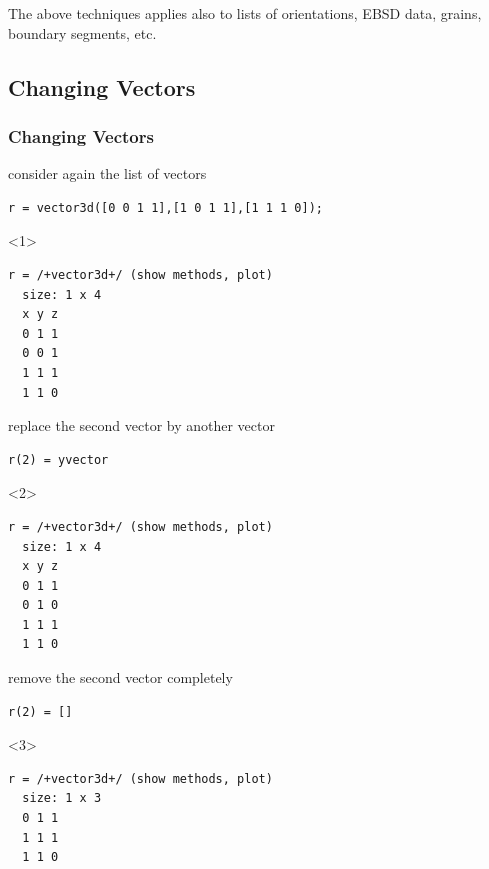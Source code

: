 \documentclass[compress]{beamer}
\begin{document}
\begin{frame}[fragile]
\begin{overlayarea}{\textwidth}{8cm}
    \pause \medskip

    \alert{The above techniques applies also to lists of
    orientations, EBSD data, grains, boundary segments, etc.}
  \end{overlayarea}
\end{frame}


\subsection*{Changing Vectors}

\begin{frame}[fragile]
  \frametitle{Changing Vectors}

  \begin{overlayarea}{\textwidth}{8cm}

    consider again the list of vectors
    \begin{lstlisting}[style=input]
r = vector3d([0 0 1 1],[1 0 1 1],[1 1 1 0]);
    \end{lstlisting}

    \begin{onlyenv}<1>
      \vspace{-0.3cm}
      \begin{lstlisting}[style=output]
r = /+vector3d+/ (show methods, plot)
  size: 1 x 4
  x y z
  0 1 1
  0 0 1
  1 1 1
  1 1 0
      \end{lstlisting}
    \end{onlyenv}

    \pause \medskip

    replace the second vector by another vector
    \begin{lstlisting}[style=input]
r(2) = yvector
    \end{lstlisting}

    \begin{onlyenv}<2>
      \vspace{-0.3cm}
      \begin{lstlisting}[style=output]
r = /+vector3d+/ (show methods, plot)
  size: 1 x 4
  x y z
  0 1 1
  0 1 0
  1 1 1
  1 1 0
      \end{lstlisting}
    \end{onlyenv}

    \pause \medskip

    remove the second vector completely
    \begin{lstlisting}[style=input]
r(2) = []
    \end{lstlisting}
    \begin{onlyenv}<3>
      \vspace{-0.3cm}
      \begin{lstlisting}[style=output]
r = /+vector3d+/ (show methods, plot)
  size: 1 x 3
  0 1 1
  1 1 1
  1 1 0
      \end{lstlisting}
    \end{onlyenv}


\end{overlayarea}
\end{frame}
\end{document}
